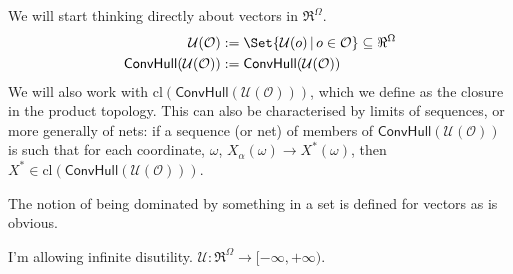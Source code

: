 \documentclass[a4paper]{article}
\newtheorem{definition}{Definition}
\newcommand\cl{\mathrm{cl}}
\renewcommand\O{\mathcal{O}}
\newcommand\Uwald{\mathcal{U}} %
\newcommand{\Conv}{\mathsf{ConvHull}}
\newcommand\SetDelimiter[1][]{
	\nonscript\,#1\vert \allowbreak \nonscript\,\mathopen{}}
\providecommand\given{\SetDelimiter}
\renewcommand{\geq}{\geqslant}
\newenvironment{CCM rewritten}
{\begingroup\color{blue}} %
{\endgroup}              %
\begin{document}
	
	We will start thinking directly about vectors in $\Re^\Omega$. 
	\begin{align} 
		\Uwald(\O) &:= \Set{\Uwald(o)\given o\in \O}\subseteq\Re^\Omega\\
		\Conv(\Uwald(\O))&:=\mathsf{ConvHull}(\Uwald(\O))
	\end{align}
	We will also work with $\cl(\Conv(\Uwald(\O)))$, which we define as the closure in the product topology. This can also be characterised by limits of sequences, or more generally of nets: if a sequence (or net) of members of $\Conv(\Uwald(\O))$ is such that for each coordinate, $\omega$, $X_\alpha(\omega)\longrightarrow X^*(\omega)$, then $X^*\in\cl(\Conv(\Uwald(\O)))$. 
	
	
	The notion of being dominated by something in a set is defined for vectors as is obvious. 
	
	\begin{infversion}
		I'm allowing infinite disutility. $\Uwald:\Re^\Omega\to[-\infty,+\infty)$. 
	\end{infversion}
	
\end{document}
